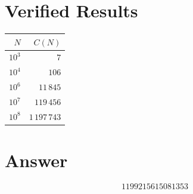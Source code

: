 \documentclass[11pt,a4paper]{article}
\begin{document}
\section{Verified Results}

\begin{center}
\begin{tabular}{@{}rr@{}}
\toprule
$N$ & $C(N)$ \\
\midrule
$10^3$  & $7$ \\
$10^4$  & $106$ \\
$10^6$  & $11\,845$ \\
$10^7$  & $119\,456$ \\
$10^8$  & $1\,197\,743$ \\
\bottomrule
\end{tabular}
\end{center}

\section{Answer}

\[
\boxed{1199215615081353}
\]
\end{document}
